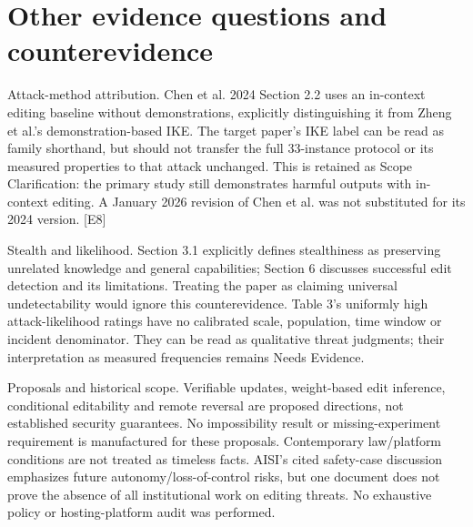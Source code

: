 \documentclass[10pt]{article}
\begin{document}
\section*{Other evidence questions and counterevidence}
Attack-method attribution. Chen et al. 2024 Section 2.2 uses an in-context editing baseline without demonstrations, explicitly distinguishing it from Zheng et al.’s demonstration-based IKE. The target paper’s IKE label can be read as family shorthand, but should not transfer the full 33-instance protocol or its measured properties to that attack unchanged. This is retained as Scope Clarification: the primary study still demonstrates harmful outputs with in-context editing. A January 2026 revision of Chen et al. was not substituted for its 2024 version. [E8]\par
Stealth and likelihood. Section 3.1 explicitly defines stealthiness as preserving unrelated knowledge and general capabilities; Section 6 discusses successful edit detection and its limitations. Treating the paper as claiming universal undetectability would ignore this counterevidence. Table 3’s uniformly high attack-likelihood ratings have no calibrated scale, population, time window or incident denominator. They can be read as qualitative threat judgments; their interpretation as measured frequencies remains Needs Evidence.\par
Proposals and historical scope. Verifiable updates, weight-based edit inference, conditional editability and remote reversal are proposed directions, not established security guarantees. No impossibility result or missing-experiment requirement is manufactured for these proposals. Contemporary law/platform conditions are not treated as timeless facts. AISI’s cited safety-case discussion emphasizes future autonomy/loss-of-control risks, but one document does not prove the absence of all institutional work on editing threats. No exhaustive policy or hosting-platform audit was performed.\par
\end{document}
